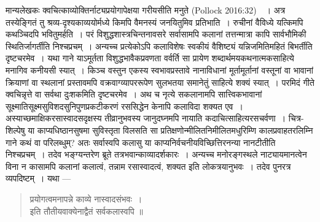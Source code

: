 {\dev मान्यलेखकः क्वचित्काव्योक्तिर्नाट्यप्रयोगापेक्षया गरीयसीति मनुते} (Pollock 2016:32)~{\dev~। अत्र तस्येङ्गितं तु श्रव्य-दृश्यकाव्ययोर्मध्ये किमपि वैमनस्यं जनयितुमिव प्रतिभाति~। रुचीनां वैविध्ये यत्किमपि कथञ्चिदपि भवितुमर्हति~। परं विशुद्धशास्त्रचिन्तनावसरे सर्वासामपि कलानां तत्तन्मात्रा कापि सार्वभौमिकी स्थितिर्जागर्तीति निश्चप्रचम्~। अन्यच्च प्रत्येकोऽपि कलाविशेषः स्वकीयं वैशिष्ट्यं यन्निजमितिमहितं बिभर्तीति दृष्टचरमेव~। यथा गाने याऽमूर्तता  विशुद्धभावैकप्रवणता वर्वर्ति सा प्रायेण शब्दार्थमयकथनात्मकसाहित्ये मनागिव कनीयसी स्यात्~। किञ्च वस्तुन एकस्य स्वभावप्रस्तावे नानाविधानां मूर्तामूर्तानां वस्तूनां वा भावानां क्रियाणां वा स्थलानां प्रस्तावमपि वक्रवाग्व्यापररूपेण सुलभतया समानेतुं साहित्ये शक्यं स्यात्~। परमिदं गीते क्वचिन्नृत्ते वा सर्वथा दुःशकमिति दृष्टचरमेव~। अथ च नृत्ये सकलानामपि सात्त्विकभावानां सूक्ष्मातिसूक्ष्मसुविशदसुनिपुणप्रकटीकरणं रससिद्धेन केनापि कलाविदा शक्यत एव~। अस्याच्छमाक्षिकरसास्वादसदृक्षस्य तीव्रानुभवस्य जानुदघ्नमपि नायाति कदाचित्साहित्यरसचर्वणा~। चित्र-शिल्पेषु या काप्यधिष्ठानसुषमा सुविस्तृता विलसति सा प्रतिक्षणोन्मीलितनिमीलितमधुरिम्णि कालप्रवाहतरलिम्नि गाने कथं वा परिलब्धुम्? अतः सर्वास्वपि कलासु या काप्यनिर्वचनीयविच्छित्तिरनन्या नानटीतीति निश्चप्रचम्~। तदेव भङ्ग्यन्तरेण ब्रूते तत्रभवान्काव्यादर्शकारः~। अन्यच्च मनोरङ्गस्थले नाट्यायमानत्वेन विना न कासामपि कलानां कलात्वं, तन्नाम रसास्वादत्वं, शक्यत इति लोकत्रयानुभवः~। तदेव पुनरत्र व्यपदिष्टम्~। यथा ---} 
\begin{quote}
{\dev प्रयोगत्वमनापन्ने काव्ये नास्वादसंभवः~।}\\
{\dev इति तौतीयवाक्येनाद्वैतं सर्वकलास्वपि ॥}
\end{quote}

